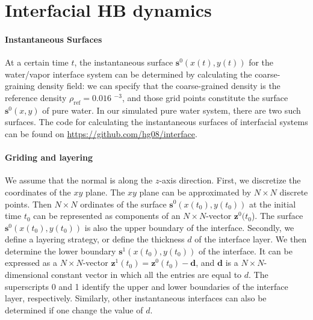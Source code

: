 \section{Interfacial HB dynamics} \label{ihb_and_selection}
\paragraph{Instantaneous Surfaces}
At a certain time $t$, the instantaneous surface ${\mathbf s}^0(x(t),y(t))$ for the water/vapor interface system can be determined by calculating 
the coarse-graining density field: we can specify that the coarse-grained density is the reference density $\rho_\text{ref} = 0.016 $ \A$^{-3}$,
and those grid points constitute the surface ${\mathbf s}^0(x,y)$ of pure water. In our simulated pure water system, there are two such surfaces.
The code for calculating the instantaneous surfaces of interfacial systems can be found on \url{https://github.com/hg08/interface}. 
\paragraph{Griding and layering}
We assume that the normal is along the $z$-axis direction. 
First, we discretize the coordinates of the $xy$ plane. 
The $xy$ plane can be approximated by $N\times N$ discrete points. 
Then $N\times N$ ordinates of the surface ${\mathbf s}^0(x(t_0),y(t_0))$ at the initial time $t_0$ can be represented as components of an $N\times N$-vector ${\mathbf z}^0(t_0$). 
The surface ${\mathbf s}^0(x(t_0),y(t_0))$ is also the upper boundary of the interface.
Secondly, we define a layering strategy, or define the thickness $d$ of the interface layer. 
We then determine the lower boundary ${\mathbf s}^1(x(t_0),y(t_0))$ of the interface. 
It can be expressed as a $N\times N$-vector ${\mathbf z}^1(t_0)={\mathbf z}^0(t_0)-{\mathbf d}$, 
and ${\mathbf d}$ is a $N\times N$-dimensional constant vector in which all the entries are equal to $d$. 
The superscripts 0 and 1 identify the upper and lower boundaries of the interface layer, respectively. 
Similarly, other instantaneous interfaces can also be determined if one change the value of $d$.

